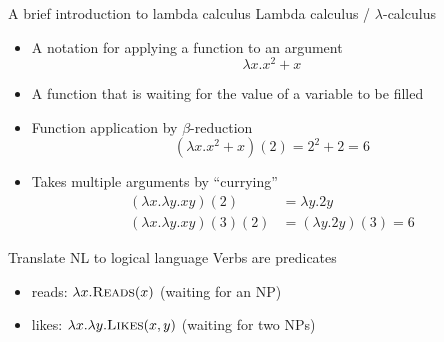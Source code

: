 \documentclass[usenames,dvipsnames,notes]{beamer}
\begin{document}
\begin{frame}
    {A brief introduction to lambda calculus}
    Lambda calculus / $\lambda$-calculus\\
    \begin{itemize}
        \item A notation for applying a function to an argument
              $$\lambda x.x^2+x$$
        \item A function that is waiting for the value of a variable to be filled
        \item Function application by $\beta$-reduction
            $$(\lambda x.x^2+x)(2) = 2^2+2 = 6$$
        \item Takes multiple arguments by ``currying''
            \begin{align*}
                (\lambda x.\lambda y.xy)(2) &= \lambda y.2y \\
                (\lambda x.\lambda y.xy)(3)(2) &= (\lambda y.2y)(3) = 6
            \end{align*}
    \end{itemize}
\end{frame}

\begin{frame}
    {Translate NL to logical language}
    Verbs are predicates \\
    \begin{itemize}
        \item reads: $\lambda x.\textsc{Reads}(x)$ (waiting for an NP)
        \item likes: $\lambda x.\lambda y.\textsc{Likes}(x,y)$ (waiting for two NPs)
    \end{itemize}
    \centering
\end{frame}
\end{document}
